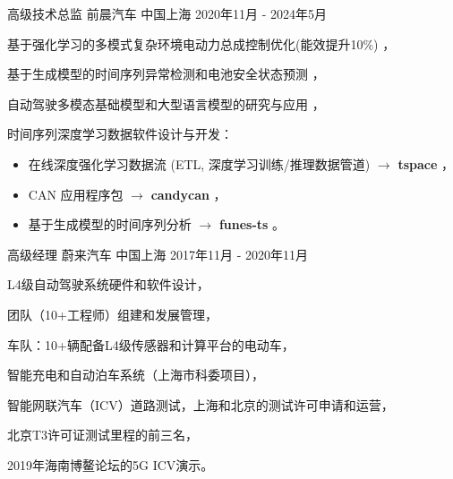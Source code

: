 \documentclass[../resume_xin.tex]{subfiles}
\begin{document}


\begin{cventries}

  \cventry
    {高级技术总监} %
    {前晨汽车} %
    {中国上海} %
    {2020年11月 - 2024年5月} %
    {
      \begin{cvitems} %
          \item 基于强化学习的多模式复杂环境电动力总成控制优化(能效提升10\%) \supercite{Xin_VEOS_22}，
          \item 基于生成模型的时间序列异常检测和电池安全状态预测 \supercite{Xin_GenAI_23}，
          \item 自动驾驶多模态基础模型和大型语言模型的研究与应用 \supercite{Xin_VLM_24} \supercite{Xin_Latent_Diffusion_23}，
          \item 时间序列深度学习数据软件设计与开发：
            \begin{itemize}
                    \item 在线深度强化学习数据流 (ETL, 深度学习训练/推理数据管道) $\rightarrow$ \textbf{tspace} \href{https://binjian.github.io/tspace/}{}，
                    \item CAN 应用程序包 $\rightarrow$ \textbf{candycan} \href{https://binjian.github.io/candycan/}{}，
                    \item 基于生成模型的时间序列分析 $\rightarrow$ \textbf{funes-ts} \href{https://github.io/binjian/funes-ts/}{}。
            \end{itemize}
      \end{cvitems}
    }

  \cventry
    {高级经理} %
    {蔚来汽车} %
    {中国上海} %
    {2017年11月 - 2020年11月} %
    {
      \begin{cvitems}
        \item L4级自动驾驶系统硬件和软件设计，
        \item 团队（10+工程师）组建和发展管理，
        \item 车队：10+辆配备L4级传感器和计算平台的电动车，
        \item 智能充电和自动泊车系统（上海市科委项目），
        \item 智能网联汽车（ICV）道路测试，上海和北京的测试许可申请和运营，
        \item 北京T3许可证测试里程的前三名，
        \item 2019年海南博鳌论坛的5G ICV演示。
      \end{cvitems}
    }


\end{cventries}
\end{document}
